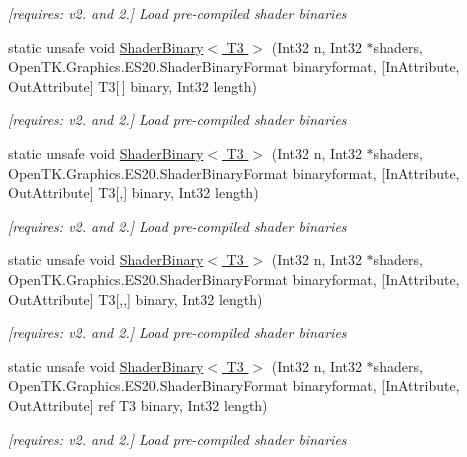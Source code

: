 \begin{DoxyCompactItemize}
\begin{DoxyCompactList}\small\item\em \mbox{[}requires\-: v2. and 2.\mbox{]} Load pre-\/compiled shader binaries \end{DoxyCompactList}\item 
static unsafe void \hyperlink{class_open_t_k_1_1_graphics_1_1_e_s20_1_1_g_l_a7524a9d47438046be418f50a0eb8f2bb}{Shader\-Binary$<$ T3 $>$} (Int32 n, Int32 $\ast$shaders, Open\-T\-K.\-Graphics.\-E\-S20.\-Shader\-Binary\-Format binaryformat, \mbox{[}In\-Attribute, Out\-Attribute\mbox{]} T3\mbox{[}$\,$\mbox{]} binary, Int32 length)
\begin{DoxyCompactList}\small\item\em \mbox{[}requires\-: v2. and 2.\mbox{]} Load pre-\/compiled shader binaries \end{DoxyCompactList}\item 
static unsafe void \hyperlink{class_open_t_k_1_1_graphics_1_1_e_s20_1_1_g_l_a10b396c70b366ac284d4b98060fcf255}{Shader\-Binary$<$ T3 $>$} (Int32 n, Int32 $\ast$shaders, Open\-T\-K.\-Graphics.\-E\-S20.\-Shader\-Binary\-Format binaryformat, \mbox{[}In\-Attribute, Out\-Attribute\mbox{]} T3\mbox{[},\mbox{]} binary, Int32 length)
\begin{DoxyCompactList}\small\item\em \mbox{[}requires\-: v2. and 2.\mbox{]} Load pre-\/compiled shader binaries \end{DoxyCompactList}\item 
static unsafe void \hyperlink{class_open_t_k_1_1_graphics_1_1_e_s20_1_1_g_l_accf95dda1549de7dd056cecb821523b0}{Shader\-Binary$<$ T3 $>$} (Int32 n, Int32 $\ast$shaders, Open\-T\-K.\-Graphics.\-E\-S20.\-Shader\-Binary\-Format binaryformat, \mbox{[}In\-Attribute, Out\-Attribute\mbox{]} T3\mbox{[},,\mbox{]} binary, Int32 length)
\begin{DoxyCompactList}\small\item\em \mbox{[}requires\-: v2. and 2.\mbox{]} Load pre-\/compiled shader binaries \end{DoxyCompactList}\item 
static unsafe void \hyperlink{class_open_t_k_1_1_graphics_1_1_e_s20_1_1_g_l_a8ab30b7f73b9da2f476d1cd7697d9c8d}{Shader\-Binary$<$ T3 $>$} (Int32 n, Int32 $\ast$shaders, Open\-T\-K.\-Graphics.\-E\-S20.\-Shader\-Binary\-Format binaryformat, \mbox{[}In\-Attribute, Out\-Attribute\mbox{]} ref T3 binary, Int32 length)
\begin{DoxyCompactList}\small\item\em \mbox{[}requires\-: v2. and 2.\mbox{]} Load pre-\/compiled shader binaries \end{DoxyCompactList}\item 

\end{DoxyCompactItemize}
